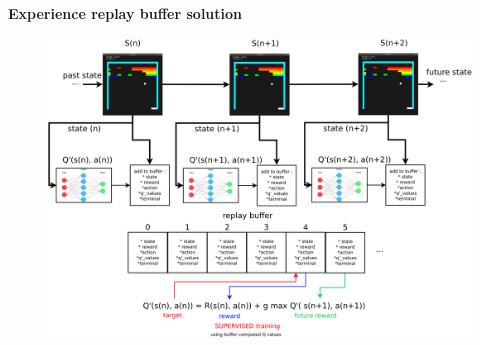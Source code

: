 \documentclass[xcolor=dvipsnames]{beamer}
\begin{document}
\begin{frame}{\bf Experience replay buffer solution}

\begin{figure}
  \includegraphics[scale=0.15]{./diagrams/dqn_replay_buffer.png}
\end{figure}

\end{frame}
\end{document}
